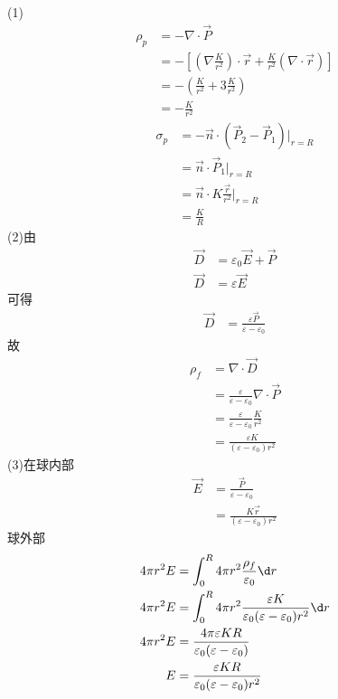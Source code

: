 \documentclass{phyasgn}
\begin{document}
\begin{sol}[8]
    (1)\begin{align*}
        \rho_p&=-\nabla\cdot\vec{P}\\
        &=-[(\nabla\frac{K}{r^2})\cdot\vec{r}+\frac{K}{r^2}(\nabla\cdot\vec{r})]\\
        &=-(\frac{K}{r^2}+3\frac{K}{r^2})\\
        &=-\frac{K}{r^2}
    \end{align*}
    \begin{align*}
        \sigma_p&=-\vec{n}\cdot(\vec{P}_2-\vec{P}_1)|_{r=R}\\
        &=\vec{n}\cdot\vec{P}_1|_{r=R}\\
        &=\vec{n}\cdot K\frac{\vec{r}}{r^2}|_{r=R}\\
        &=\frac{K}{R}
    \end{align*}
    (2)由
    \begin{align*}
        \vec{D}&=\varepsilon_0\vec{E}+\vec{P}\\
        \vec{D}&=\varepsilon\vec{E}
    \end{align*}
    可得
    \begin{align*}
        \vec{D}&=\frac{\varepsilon\vec{P}}{\varepsilon-\varepsilon_0}
    \end{align*}
    故
    \begin{align*}
        \rho_f&=\nabla\cdot\vec{D}\\
        &=\frac{\varepsilon}{\varepsilon-\varepsilon_0}\nabla\cdot\vec{P}\\
        &=\frac{\varepsilon}{\varepsilon-\varepsilon_0}\frac{K}{r^2}\\
        &=\frac{\varepsilon K}{(\varepsilon-\varepsilon_0)r^2}
    \end{align*}
    (3)在球内部
    \begin{align*}
        \vec{E}&=\frac{\vec{P}}{\varepsilon-\varepsilon_0}\\
        &=\frac{K\vec{r}}{(\varepsilon-\varepsilon_0)r^2}
    \end{align*}
    球外部
    \begin{align*}
        4\pi r^2E&=\int_{0}^{R}4\pi r^2\frac{\rho_f}{\varepsilon_0}\d r\\
        4\pi r^2E&=\int_{0}^{R}4\pi r^2\frac{\varepsilon K}{\varepsilon_0(\varepsilon-\varepsilon_0)r^2}\d r\\
        4\pi r^2E&=\frac{4\pi\varepsilon KR}{\varepsilon_0(\varepsilon-\varepsilon_0)}\\
        E&=\frac{\varepsilon KR}{\varepsilon_0(\varepsilon-\varepsilon_0)r^2}

\end{align*}
\end{sol}
\end{document}
